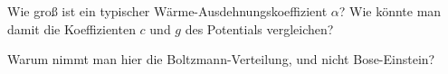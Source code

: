 \begin{questions} 
\item Wie groß ist ein typischer Wärme-Ausdehnungskoeffizient $\alpha$? Wie könnte man damit die Koeffizienten $c$ und $g$ des Potentials vergleichen?


%
\item {Warum nimmt man hier die Boltzmann-Verteilung, und nicht Bose-Einstein?}

\end{questions}
 

